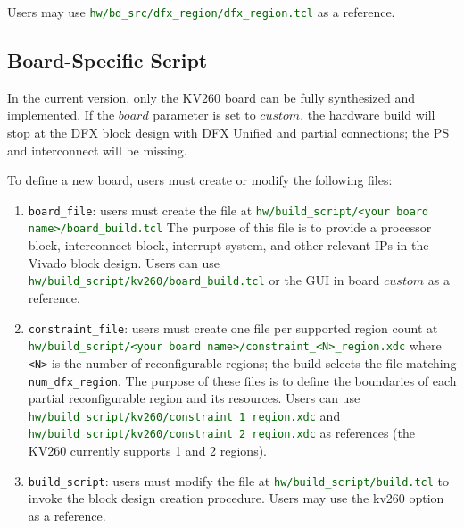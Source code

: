 \documentclass{cernatsnote}
\begin{document}
Users may use \textcolor{darkgreen}{\texttt{hw/bd\_src/dfx\_region/dfx\_region.tcl}} as a reference.


\subsection{Board-Specific Script}

In the current version, only the KV260 board can be fully synthesized and implemented. If the $board$ parameter is set to $custom$, the hardware build will stop at the DFX block design with DFX Unified and partial connections; the PS and interconnect will be missing.

To define a new board, users must create or modify the following files:
  \begin{enumerate}
    \item \texttt{board\_file}: users must create the file at \newline\textcolor{darkgreen}{\texttt{hw/build\_script/<your board name>/board\_build.tcl}} \newline The purpose of this file is to provide a processor block, interconnect block, interrupt system, and other relevant IPs in the Vivado block design. Users can use \newline\textcolor{darkgreen}{\texttt{hw/build\_script/kv260/board\_build.tcl}} or the GUI in board $custom$ as a reference.
    \item \texttt{constraint\_file}: users must create one file per supported region count at \newline\textcolor{darkgreen}{\texttt{hw/build\_script/<your board name>/constraint\_<N>\_region.xdc}} \newline where \texttt{<N>} is the number of reconfigurable regions; the build selects the file matching \texttt{num\_dfx\_region}. The purpose of these files is to define the boundaries of each partial reconfigurable region and its resources. Users can use \newline\textcolor{darkgreen}{\texttt{hw/build\_script/kv260/constraint\_1\_region.xdc}} and \newline\textcolor{darkgreen}{\texttt{hw/build\_script/kv260/constraint\_2\_region.xdc}} as references (the KV260 currently supports 1 and 2 regions).
    \item \texttt{build\_script}: users must modify the file at \newline\textcolor{darkgreen}{\texttt{hw/build\_script/build.tcl}} to invoke the block design creation procedure. Users may use the kv260 option as a reference.
  \end{enumerate}
\end{document}
